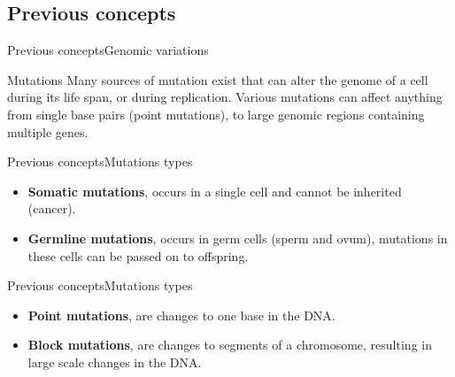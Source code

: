\documentclass[10pt]{beamer}
\newcommand{\1}{
	\setbeamertemplate{background}{
		\texttt{[image: img/1]}
		\tikz[overlay] \fill[fill opacity=0.75,fill=white] (0,0) rectangle (-\paperwidth,\paperheight);
	}
}
\begin{document}
\subsection{Previous concepts}

\begin{frame}{Previous concepts}{Genomic variations}
	\begin{block}{Mutations}
		Many sources of mutation exist that can alter the genome of a cell during its life span, or during replication. Various mutations can affect anything from single base pairs (point mutations), to large genomic regions containing multiple genes.
	\end{block}
\end{frame}



\begin{frame}{Previous concepts}{Mutations types}
	\begin{block}{}
		\begin{itemize}
			\item \textbf{Somatic mutations}, occurs in a single cell and cannot be inherited (cancer).
			\item \textbf{Germline mutations}, occurs in germ cells (sperm and ovum), mutations in these cells can be passed on to offspring.
		\end{itemize}	
	\end{block}
\end{frame}

\begin{frame}{Previous concepts}{Mutations types}
	\begin{block}{}
		\begin{itemize}
			\item \textbf{Point mutations}, are changes to one base in the DNA.
			\item \textbf{Block mutations}, are changes to segments of a chromosome, resulting in large scale changes in the DNA.
		\end{itemize}	
	\end{block}
\end{frame}
\end{document}
